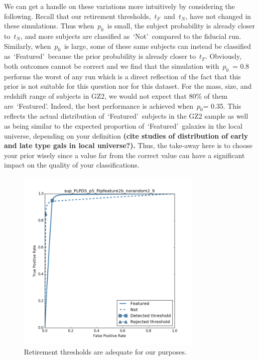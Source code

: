 \documentclass[twocolumn]{aastex6}
\newcommand{\p}{$p_0$}
\newcommand{\tf}{$t_F$}
\newcommand{\tn}{$t_N$}
\newcommand{\feat}{`Featured'}
\newcommand{\notfeat}{`Not'}
\begin{document}
We can get a handle on these variations more intuitively by considering the following.
Recall that our retirement thresholds,~\tf~and~\tn, have not changed in these simulations. 
Thus when~\p~is small, the subject probability is already closer to~\tn, and more 
subjects are classified as~\notfeat~compared to the fiducial run.
Similarly, when~\p~is large, some of these same subjects can instead be classified
as~\feat~because the prior probability is already closer to~\tf. Obviously, both 
outcomes cannot be correct and we find that the simulation with~\p~= 0.8 performs
the worst of any run which is a direct reflection of the fact that this prior is not 
suitable for this question nor for this dataset. For the mass, size, and redshift range
of subjects in GZ2, we would not expect that 80\% of them are~\feat. Indeed, 
the best performance is achieved when~\p = 0.35.  This reflects the actual 
distribution of~\feat~subjects in the GZ2 sample as well as being similar to the 
expected proportion of~\feat~galaxies in the local universe, depending on your
definition\textbf{ (cite studies of distribution of early and late type gals in local universe?). }
Thus, the take-away here is to choose your prior wisely since a value far from the correct
value can have a significant impact on the quality of your classifications.
 
\begin{figure}[t!]
\includegraphics[width=3.5in]{figures/GZX_ROC_sup_PLPD5_p5_flipfeature2b_norandom2_9.png}
\caption{Retirement thresholds are adequate for our purposes.  \label{fig: retirement thresholds}}
\end{figure}
\end{document}
